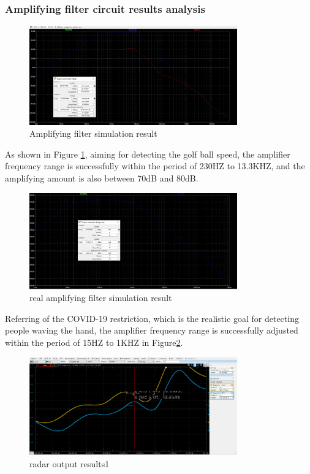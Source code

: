 \subsubsection{Amplifying filter circuit results analysis}
\begin{figure}[H]
    \centering
    \includegraphics[width=0.8\textwidth]{figure/Amplifyingfiltersimulation result.png}
    \caption{Amplifying filter simulation result}
     \label{fig:amplifying}
\end{figure}
As shown in Figure \ref{fig:amplifying}, aiming for detecting the golf ball speed, the amplifier frequency range is successfully within the period of 230HZ to 13.3KHZ, and the amplifying amount is also between 70dB and 80dB.
\begin{figure}[H]
    \centering
    \includegraphics[width=0.8\textwidth]{figure/realamplifyingfiltersimulationresult.png}
    \caption{real amplifying filter simulation result}
     \label{fig:amplifying_real}
\end{figure}
Referring of the COVID-19 restriction, which is the realistic goal for detecting people waving the hand, the amplifier frequency range is successfully adjusted within the period of 15HZ to 1KHZ in Figure\ref{fig:amplifying_real}. 
\begin{figure}[H]
    \centering
    \includegraphics[width=0.8\textwidth]{figure/radar output results1.png}
    \caption{radar output results1}
     \label{fig:radar_output}
\end{figure}
